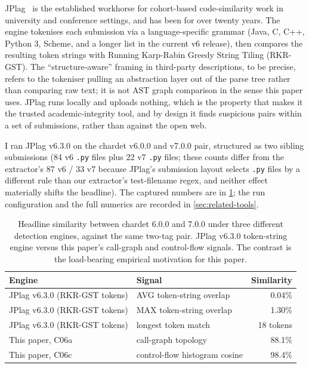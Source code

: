 \documentclass[11pt,letterpaper]{article}
\begin{document}
JPlag~\cite{prechelt2002jplag,jplag2026repo} is the established
workhorse for cohort-based code-similarity work in university and
conference settings, and has been for over twenty years. The engine
tokenises each submission via a language-specific grammar (Java, C,
C++, Python 3, Scheme, and a longer list in the current v6 release),
then compares the resulting token strings with Running Karp-Rabin
Greedy String Tiling (RKR-GST). The ``structure-aware'' framing in
third-party descriptions, to be precise, refers to the tokeniser
pulling an abstraction layer out of the parse tree rather than
comparing raw text; it is not AST graph comparison in the sense this
paper uses. JPlag runs locally and uploads nothing, which is the
property that makes it the trusted academic-integrity tool, and by
design it finds suspicious pairs within a set of submissions, rather
than against the open web.

I ran JPlag v6.3.0 on the chardet v6.0.0 and v7.0.0 pair, structured
as two sibling submissions (84 v6 \texttt{.py} files plus 22 v7
\texttt{.py} files; these counts differ from the extractor's 87 v6 /
33 v7 because JPlag's submission layout selects \texttt{.py} files by a
different rule than our extractor's test-filename regex, and neither
effect materially shifts the headline). The captured numbers are in
\cref{tab:jplag-vs-c06}; the run configuration and the full numerics
are recorded in \cref{sec:related-tools}.

\begin{table}[h]
\small
\centering
\caption{Headline similarity between chardet 6.0.0 and 7.0.0 under
three different detection engines, against the same two-tag pair.
JPlag v6.3.0 token-string engine versus this paper's call-graph and
control-flow signals. The contrast is the load-bearing empirical
motivation for this paper.}
\label{tab:jplag-vs-c06}
\begin{tabular}{@{}llr@{}}
\toprule
Engine & Signal & Similarity \\
\midrule
JPlag v6.3.0 (RKR-GST tokens) & AVG token-string overlap & 0.04\% \\
JPlag v6.3.0 (RKR-GST tokens) & MAX token-string overlap & 1.30\% \\
JPlag v6.3.0 (RKR-GST tokens) & longest token match & 18 tokens \\
\midrule
This paper, C06a & call-graph topology & 88.1\% \\
This paper, C06c & control-flow histogram cosine & 98.4\% \\
\bottomrule
\end{tabular}
\end{table}
\end{document}

